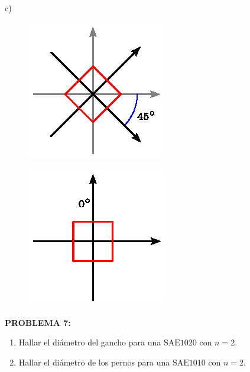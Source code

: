 \documentclass[letter,10pt,twoside]{article}
\begin{document}
c) 

\begin{figure}[H]
\centering
\includegraphics[scale=1.6]{resources/f62.eps}
\end{figure}

\begin{figure}[H]
\centering
\includegraphics[scale=1.6]{resources/f63.eps}
\end{figure}

\newpage

\colorbox{blue!25}{\textbf{PROBLEMA 7:}}

\begin{enumerate}[label=\alph*)]
    \item Hallar el diámetro del gancho para una $\text{SAE1020}$ con $n = 2$.
    \item Hallar el diámetro de los pernos para una $\text{SAE1010}$ con
        $n = 2$.
\end{enumerate}
\end{document}
